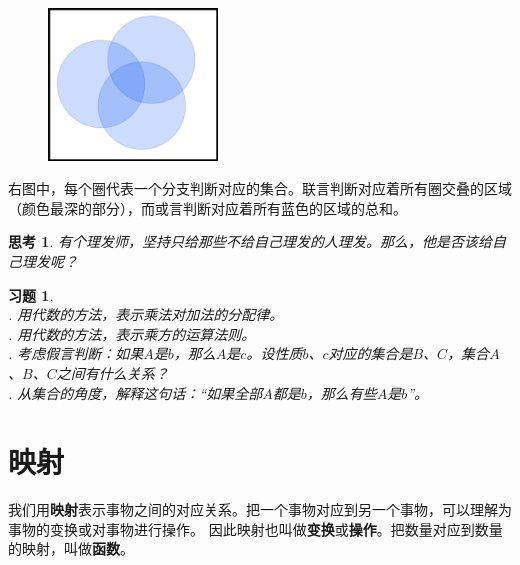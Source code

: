 \documentclass[12pt,UTF8]{ctexbook}
\newtheorem{sk}{思考}[section]
\newtheorem{xt}{习题}[section]
\begin{document}
\begin{figure} %
    \vspace{-28pt}
    \flushright
    \includegraphics[width=0.4\textwidth]{tu/叠圈图1.png}
\end{figure}

右图中，每个圈代表一个分支判断对应的集合。联言判断对应着所有圈交叠的区域（颜色最深的部分），而或言判断对应着所有蓝色的区域的总和。

\begin{sk}\label{sk:2-1-1}
     有个理发师，坚持只给那些不给自己理发的人理发。那么，他是否该给自己理发呢？
\end{sk}

\begin{xt}\label{xt:2-1-1}
    \mbox{} \\
    . 用代数的方法，表示乘法对加法的分配律。\\
    . 用代数的方法，表示乘方的运算法则。\\
    . 考虑假言判断：如果$A$是$b$，那么$A$是$c$。设性质$b$、$c$对应的集合是$B$、$C$，集合$A$、$B$、$C$之间有什么关系？\\
    . 从集合的角度，解释这句话：“如果全部$A$都是$b$，那么有些$A$是$b$”。
\end{xt}

\section{映射}
我们用\textbf{映射}表示事物之间的对应关系。把一个事物对应到另一个事物，可以理解为事物的变换或对事物进行操作。
因此映射也叫做\textbf{变换}或\textbf{操作}。把数量对应到数量的映射，叫做\textbf{函数}。
\end{document}
